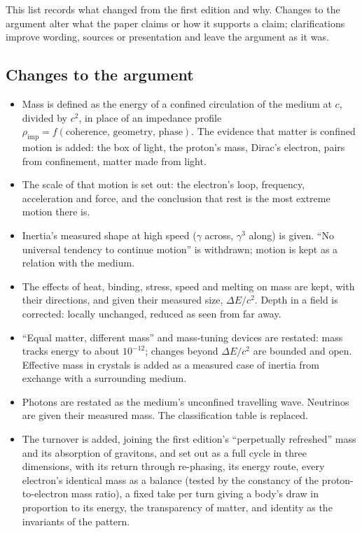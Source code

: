 \documentclass[11pt,a4paper]{article}
\begin{document}
This list records what changed from the first edition and why. Changes to the argument alter what the paper claims or how it supports a claim; clarifications improve wording, sources or presentation and leave the argument as it was.

\subsection*{Changes to the argument}
\begin{itemize}
\item Mass is defined as the energy of a confined circulation of the medium at $c$, divided by $c^2$, in place of an impedance profile $\rho_{\text{imp}} = f(\text{coherence, geometry, phase})$. The evidence that matter is confined motion is added: the box of light, the proton's mass, Dirac's electron, pairs from confinement, matter made from light.
\item The scale of that motion is set out: the electron's loop, frequency, acceleration and force, and the conclusion that rest is the most extreme motion there is.
\item Inertia's measured shape at high speed ($\gamma$ across, $\gamma^3$ along) is given. ``No universal tendency to continue motion'' is withdrawn; motion is kept as a relation with the medium.
\item The effects of heat, binding, stress, speed and melting on mass are kept, with their directions, and given their measured size, $\Delta E/c^2$. Depth in a field is corrected: locally unchanged, reduced as seen from far away.
\item ``Equal matter, different mass'' and mass-tuning devices are restated: mass tracks energy to about $10^{-12}$; changes beyond $\Delta E/c^2$ are bounded and open. Effective mass in crystals is added as a measured case of inertia from exchange with a surrounding medium.
\item Photons are restated as the medium's unconfined travelling wave. Neutrinos are given their measured mass. The classification table is replaced.
\item The turnover is added, joining the first edition's ``perpetually refreshed'' mass and its absorption of gravitons, and set out as a full cycle in three dimensions, with its return through re-phasing, its energy route, every electron's identical mass as a balance (tested by the constancy of the proton-to-electron mass ratio), a fixed take per turn giving a body's draw in proportion to its energy, the transparency of matter, and identity as the invariants of the pattern.

\end{itemize}
\end{document}
